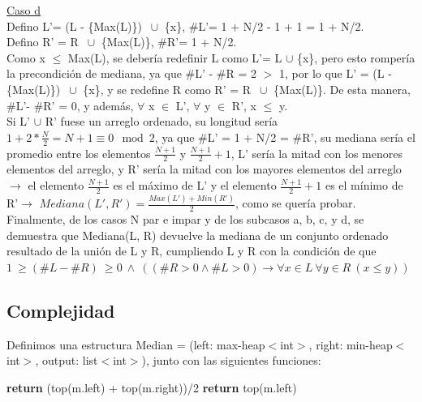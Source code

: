 \documentclass{article}
\theoremstyle{definition}
\theoremstyle{remark}
\begin{document}
\underline{Caso d} \\

Defino L'= (L - \{Max(L)\}) $\ \cup$ \{x\}, \#L'= 1 + N/2 - 1 + 1 = 1 + N/2. \\

Defino R' = R $\ \cup$ \{Max(L)\}, \#R'= 1 + N/2. \\

Como x $\leq$ Max(L), se debería redefinir L como L'= L $\cup$ \{x\}, pero esto rompería la precondición de mediana, ya que \#L' - \#R = 2 $>$ 1, por lo que L' = (L - \{Max(L)\}) $\ \cup$ \{x\}, y se redefine R como R' = R $\ \cup$ \{Max(L)\}. De esta manera, \#L'- \#R' = 0, y además, $\forall$ x $\in$ L', $\forall$ y $\in$ R', x $\leq$ y. \\
Si L' $\cup$ R' fuese un arreglo ordenado, su longitud sería $1 + 2 * \frac{N}{2} = N + 1 \equiv 0 \mod 2$, ya que \#L' = 1 + N/2 = \#R', su mediana sería el promedio entre los elementos $\frac{N+1}{2}$ y $\frac{N+1}{2} + 1$, L' sería la mitad con los menores elementos del arreglo, y R' sería la mitad con los mayores elementos del arreglo $\rightarrow$ el elemento $\frac{N+1}{2}$ es el máximo de L' y el elemento $\frac{N+1}{2} + 1$ es el mínimo de R'$\rightarrow$ $Mediana(L', R') = \frac{Max(L') + Min(R')}{2}$, como se quería probar. \\

Finalmente, de los casos N par e impar y de los subcasos a, b, c, y d, se demuestra que 
Mediana(L, R) devuelve la mediana de un conjunto ordenado resultado de la unión de L y R, cumpliendo L y R con la condición de que $1 \ \geq (\#L - \#R) \ \geq 0 \ \wedge \ ((\#R > 0 \wedge \#L >0) \rightarrow \forall x \in L \ \forall y \in R \ (x \leq y))$

\subsection{Complejidad}

Definimos una estructura Median = (left: max-heap$<$int$>$, right: min-heap$<$int$>$, output: list$<$int$>$), junto con las siguientes funciones:

\begin{algorithmic}
\State \textbf{return} (top(m.left) + top(m.right))/2 
\Else
\State \textbf{return} top(m.left) 
\EndIf
\EndProcedure \\
\end{algorithmic}
\end{document}
